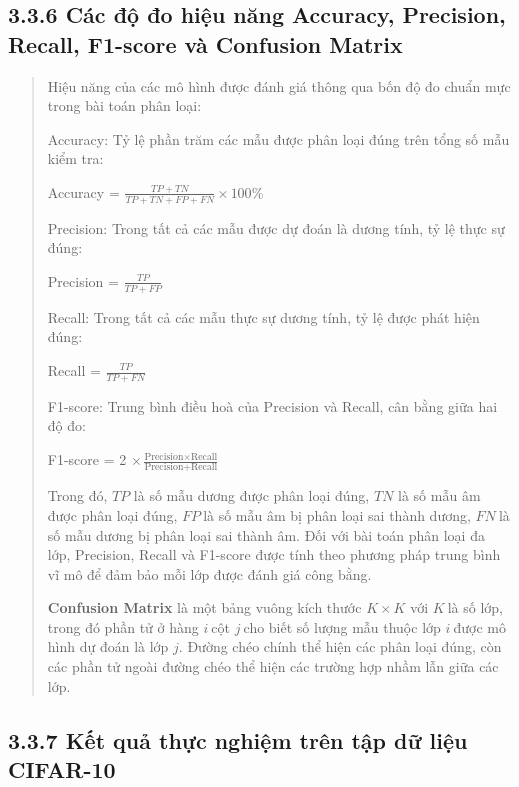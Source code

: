 \documentclass[
  12pt,
  a4paper,
]{report}
\begin{document}
\subsection*{3.3.6 Các độ đo hiệu năng Accuracy, Precision, Recall,
F1-score và Confusion
Matrix}\label{cuxe1c-ux111ux1ed9-ux111o-hiux1ec7u-nux103ng-accuracy-precision-recall-f1-score-vuxe0-confusion-matrix}

\begin{quote}
Hiệu năng của các mô hình được đánh giá thông qua bốn độ đo chuẩn mực
trong bài toán phân loại:

Accuracy: Tỷ lệ phần trăm các mẫu được phân loại đúng trên tổng số mẫu
kiểm tra:

Accuracy = \(\frac{TP + TN}{TP + TN + FP + FN} \times 100\%\)

Precision: Trong tất cả các mẫu được dự đoán là dương tính, tỷ lệ thực
sự đúng:

Precision = \(\frac{TP}{TP + FP}\)

Recall: Trong tất cả các mẫu thực sự dương tính, tỷ lệ được phát hiện
đúng:

Recall = \(\frac{TP}{TP + FN}\)

F1-score: Trung bình điều hoà của Precision và Recall, cân bằng giữa hai
độ đo:

F1-score = 2
\(\times \frac{\text{Precision} \times \text{Recall}}{\text{Precision} + \text{Recall}}\)

Trong đó, \(TP\) là số mẫu dương được phân loại đúng, \(TN\) là số mẫu
âm được phân loại đúng, \(FP\ \)là số mẫu âm bị phân loại sai thành
dương, \(FN\ \)là số mẫu dương bị phân loại sai thành âm. Đối với bài
toán phân loại đa lớp, Precision, Recall và F1-score được tính theo
phương pháp trung bình vĩ mô để đảm bảo mỗi lớp được đánh giá công bằng.

\textbf{Confusion Matrix} là một bảng vuông kích thước \(K \times K\)
với \(K\ \)là số lớp, trong đó phần tử ở hàng \(i\ \)cột \(j\ \)cho biết
số lượng mẫu thuộc lớp \(i\ \)được mô hình dự đoán là lớp \(j\). Đường
chéo chính thể hiện các phân loại đúng, còn các phần tử ngoài đường chéo
thể hiện các trường hợp nhầm lẫn giữa các lớp.
\end{quote}

\subsection*{3.3.7 Kết quả thực nghiệm trên tập dữ liệu
CIFAR-10}\label{kux1ebft-quux1ea3-thux1ef1c-nghiux1ec7m-truxean-tux1eadp-dux1eef-liux1ec7u-cifar-10}
\end{document}
